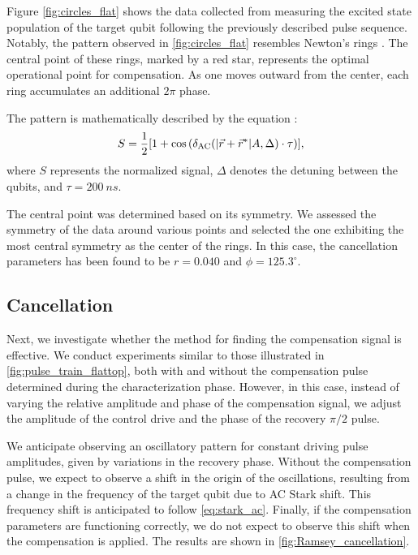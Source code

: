Figure \ref{fig:circles_flat} shows the data collected from measuring the excited state population of the target qubit following the previously described pulse sequence.
Notably, the pattern observed in \cref{fig:circles_flat} resembles Newton's rings \cite{newton}.
The central point of these rings, marked by a red star, represents the optimal operational point for compensation.
As one moves outward from the center, each ring accumulates an additional $2 \pi$ phase.

The pattern is mathematically described by the equation \cite{crosstalk}:
\begin{equation}
S = \frac{1}{2}[1 + \cos\left( \delta_{\text{AC}} (|\Vec{r} + \Vec{r}^*| A, \Delta) \cdot \tau \right)] ,
\end{equation}
where $S$ represents the normalized signal, $\Delta$ denotes the detuning between the qubits, and $\tau = \SI{200}{ns}$.

The central point was determined based on its symmetry.
We assessed the symmetry of the data around various points and selected the one exhibiting the most central symmetry as the center of the rings.
In this case, the cancellation parameters has been found to be $r = 0.040$ and $\phi = 125.3^\circ$.

\subsection{Cancellation}

Next, we investigate whether the method for finding the compensation signal is effective.
We conduct experiments similar to those illustrated in \cref{fig:pulse_train_flattop}, both with and without the compensation pulse determined during the characterization phase.
However, in this case, instead of varying the relative amplitude and phase of the compensation signal, we adjust the amplitude of the control drive and the phase of the recovery $\pi / 2$ pulse.

We anticipate observing an oscillatory pattern for constant driving pulse amplitudes, given by variations in the recovery phase.
Without the compensation pulse, we expect to observe a shift in the origin of the oscillations, resulting from a change in the frequency of the target qubit due to AC Stark shift.
This frequency shift is anticipated to follow \cref{eq:stark_ac}. 
Finally, if the compensation parameters are functioning correctly, we do not expect to observe this shift when the compensation is applied.
The results are shown in \cref{fig:Ramsey_cancellation}.

